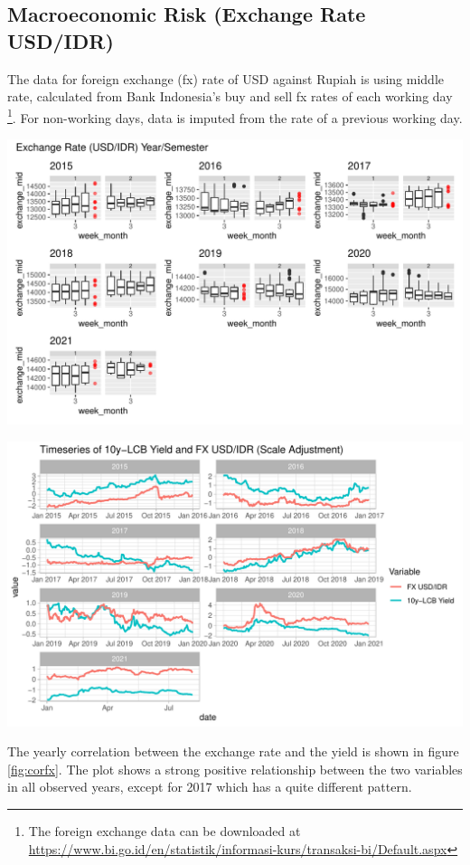 \documentclass[11pt,a4paper,]{article}
\begin{document}
\hypertarget{macroeconomic-risk-exchange-rate-usdidr}{%
\subsection{Macroeconomic Risk (Exchange Rate USD/IDR)}\label{macroeconomic-risk-exchange-rate-usdidr}}

The data for foreign exchange (fx) rate of USD against Rupiah is using middle rate, calculated from Bank Indonesia's buy and sell fx rates of each working day \footnote{The foreign exchange data can be downloaded at \url{https://www.bi.go.id/en/statistik/informasi-kurs/transaksi-bi/Default.aspx}}. For non-working days, data is imputed from the rate of a previous working day.

\includegraphics{Untitled_files/figure-latex/unnamed-chunk-16-1.pdf}

\includegraphics{Untitled_files/figure-latex/unnamed-chunk-17-1.pdf}

The yearly correlation between the exchange rate and the yield is shown in figure \ref{fig:corfx}. The plot shows a strong positive relationship between the two variables in all observed years, except for 2017 which has a quite different pattern.
\end{document}

